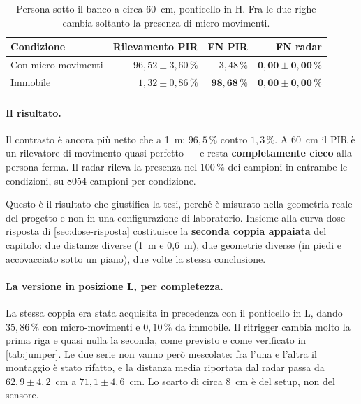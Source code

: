 \begin{table}[htbp]
\centering
\caption{Persona sotto il banco a circa 60~cm, ponticello in H. Fra le due righe
cambia soltanto la presenza di micro-movimenti.}
\label{tab:sotto-banco}
\small
\begin{tabular}{@{}lrrr@{}}
\toprule
\textbf{Condizione} & \textbf{Rilevamento PIR} & \textbf{FN PIR} & \textbf{FN radar} \\
\midrule
Con micro-movimenti & $96{,}52 \pm 3{,}60\,\%$ & $3{,}48\,\%$ & $\mathbf{0{,}00 \pm 0{,}00\,\%}$ \\
Immobile & $1{,}32 \pm 0{,}86\,\%$ & $\mathbf{98{,}68\,\%}$ & $\mathbf{0{,}00 \pm 0{,}00\,\%}$ \\
\bottomrule
\end{tabular}
\end{table}

\paragraph{Il risultato.} Il contrasto è ancora più netto che a 1~m: $96{,}5\,\%$
contro $1{,}3\,\%$. A 60~cm il PIR è un rilevatore di movimento quasi perfetto --- e
resta \textbf{completamente cieco} alla persona ferma. Il radar rileva la presenza nel
$100\,\%$ dei campioni in entrambe le condizioni, su 8054 campioni per condizione.

Questo è il risultato che giustifica la tesi, perché è misurato nella geometria reale
del progetto e non in una configurazione di laboratorio. Insieme alla curva
dose-risposta di \cref{sec:dose-risposta} costituisce la \textbf{seconda coppia
appaiata} del capitolo: due distanze diverse (1~m e 0,6~m), due geometrie diverse (in
piedi e accovacciato sotto un piano), due volte la stessa conclusione.

\paragraph{La versione in posizione L, per completezza.} La stessa coppia era stata
acquisita in precedenza con il ponticello in L, dando $35{,}86\,\%$ con
micro-movimenti e $0{,}10\,\%$ da immobile. Il ritrigger cambia molto la prima riga e
quasi nulla la seconda, come previsto e come verificato in \cref{tab:jumper}. Le due
serie non vanno però mescolate: fra l'una e l'altra il montaggio è stato rifatto, e la
distanza media riportata dal radar passa da $62{,}9 \pm 4{,}2$~cm a
$71{,}1 \pm 4{,}6$~cm. Lo scarto di circa 8~cm è del setup, non del sensore.


